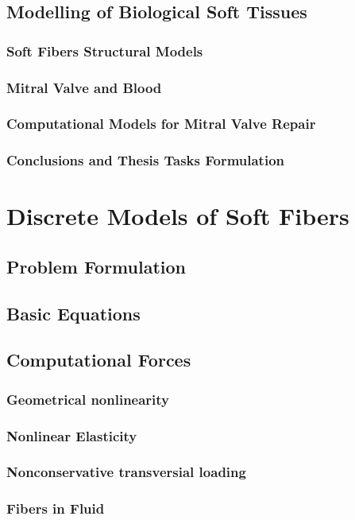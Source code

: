 \documentclass[11pt, oneside, a4paper]{report}
\begin{document}
\section{Modelling of Biological Soft Tissues}
\subsection{Soft Fibers Structural Models}
\subsection{Mitral Valve and Blood}
\subsection{Computational Models for Mitral Valve Repair}
\subsection{Conclusions and Thesis Tasks Formulation}
\chapter{Discrete Models of Soft Fibers}%
\section{Problem Formulation}
\section{Basic Equations}
\section{Computational Forces}
\subsection{Geometrical nonlinearity}
\subsection{Nonlinear Elasticity}
\subsection{Nonconservative transversial loading}
\subsection{Fibers in Fluid}
\end{document}
